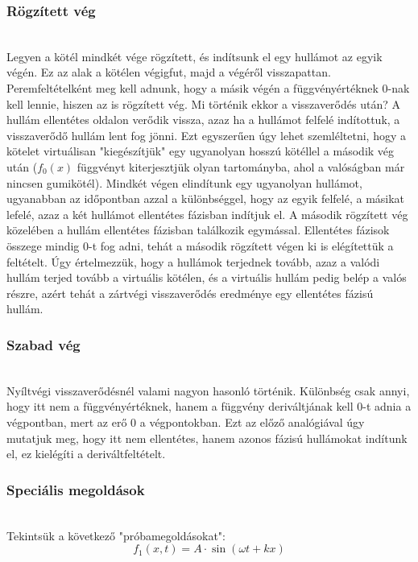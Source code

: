 \documentclass[a4paper]{article}
\begin{document}
\subsubsection*{Rögzített vég}
\\
Legyen a kötél mindkét vége rögzített, és indítsunk el egy hullámot az egyik végén. Ez az alak a kötélen végigfut, majd a végéről visszapattan. Peremfeltételként meg kell adnunk, hogy a másik végén a függvényértéknek 0-nak kell lennie, hiszen az is rögzített vég. Mi történik ekkor a visszaverődés után? A hullám ellentétes oldalon verődik vissza, azaz ha a hullámot felfelé indítottuk, a visszaverődő hullám lent fog jönni. Ezt egyszerűen úgy lehet szemléltetni, hogy a kötelet virtuálisan "kiegészítjük" egy ugyanolyan hosszú kötéllel a második vég után ($f_0(x)$ függvényt kiterjesztjük olyan tartományba, ahol a valóságban már nincsen gumikötél). Mindkét végen elindítunk egy ugyanolyan hullámot, ugyanabban az időpontban azzal a különbséggel, hogy az egyik felfelé, a másikat lefelé, azaz a két hullámot ellentétes fázisban indítjuk el. A második rögzített vég közelében a hullám ellentétes fázisban találkozik egymással. Ellentétes fázisok összege mindig 0-t fog adni, tehát a második rögzített végen ki is elégítettük a feltételt. Úgy értelmezzük, hogy a hullámok terjednek tovább, azaz a valódi hullám terjed tovább a virtuális kötélen, és a virtuális hullám pedig belép a valós részre, azért tehát a zártvégi visszaverődés eredménye egy ellentétes fázisú hullám.
\\
\subsubsection*{Szabad vég}
\\
Nyíltvégi visszaverődésnél valami nagyon hasonló történik. Különbség csak annyi, hogy itt nem a függvényértéknek, hanem a függvény deriváltjának kell 0-t adnia a végpontban, mert az erő 0 a végpontokban. Ezt az előző analógiával úgy mutatjuk meg, hogy itt nem ellentétes, hanem azonos fázisú hullámokat indítunk el, ez kielégíti a deriváltfeltételt.
\\
\subsubsection*{Speciális megoldások}
\\
Tekintsük a következő "próbamegoldásokat":
\begin{equation}
f_1(x,t)=A \cdot \sin(\omega t+kx)
\end{equation}
\end{document}
